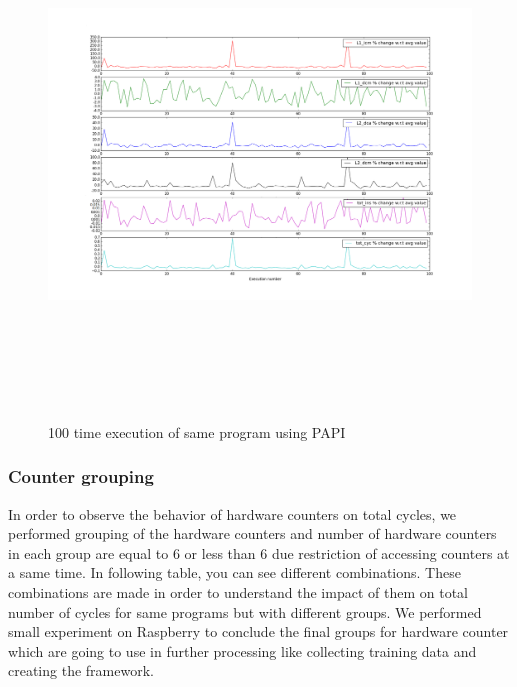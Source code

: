 \begin{figure}[h!]
\includegraphics[width=14cm, height=14cm]{./images/grp_4_perc_change}
\centering
\caption{100 time execution of same program using PAPI}
\label{fig:grp_4_perc_change}
\end{figure}

\subsubsection{Counter grouping}
In order to observe the behavior of hardware counters on total cycles, we performed grouping of the hardware counters and number of hardware counters in each group are equal to 6 or less than 6 due restriction of accessing counters at a same time. In following table, you can see different combinations. These combinations are made in order to understand the impact of them on total number of cycles for same programs but with different groups.  We performed small experiment on Raspberry to conclude the final groups for hardware counter which are going to use in further processing like collecting training data and creating the framework. 

